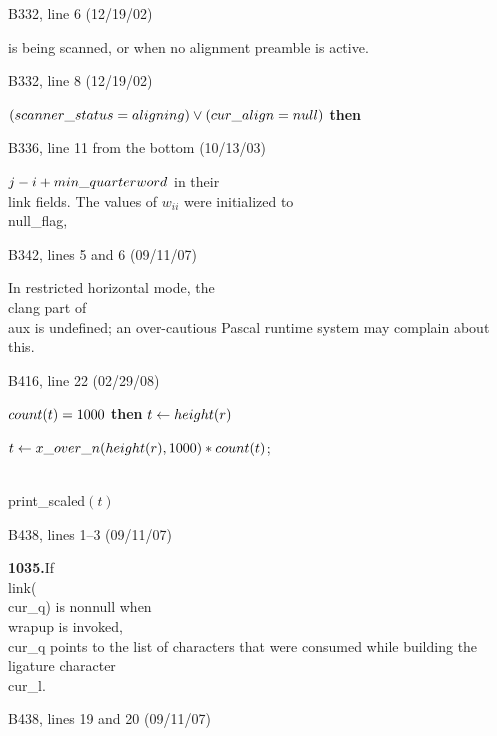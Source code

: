 {{\bugonpage B332, line 6 (12/19/02)

\tenpoint\noindent
is being scanned, or when no alignment preamble is active.

\bugonpage B332, line 8 (12/19/02)

\ninepoint\noindent
{} $(\\{scanner\_status}=\\{aligning}) \lor
 (\\{cur\_align}=\\{null})$ {\bf then}

\bugonpage B336, line 11 from the bottom (10/13/03)

\tenpoint\noindent
$j-i+\\{min\_quarterword}$ in their
\\{link} fields. The values of $w_{ii}$ were initialized to
\\{null\_flag},\cutpar

\bugonpage B342, lines 5 and 6 (09/11/07)

\tenpoint
In restricted horizontal mode, the \\{clang} part of \\{aux} is undefined;
an over-cautious Pascal runtime system may complain about this.

\bugonpage B416, line 22 (02/29/08)

\ninepoint\noindent
\qquad{} $\\{count}(t)=1000$ {\bf then} $t\gets\\{height}(r)$
\par\noindent
\qquad{} $t\gets\\{x\_over\_n}(\\{height}(r),1000)*\\{count}(t)$;
\par\noindent
\qquad\qquad\\{print\_scaled}$(t)$

\bugonpage B438, lines 1--3 (09/11/07)

\tenpoint\noindent
{\bf1035.\quad}If \\{link}(\\{cur\_q}) is nonnull when \\{wrapup} is invoked,
\\{cur\_q} points to
the list of characters that were consumed while building the ligature
character~\\{cur\_l}.

\bugonpage B438, lines 19 and 20 (09/11/07)

}}
